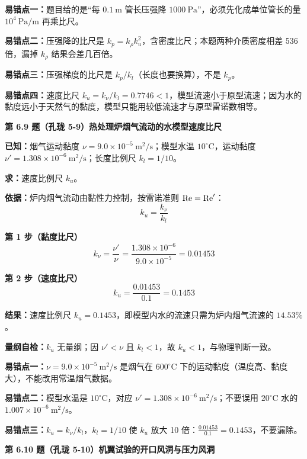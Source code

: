 \begin{yicuo}
\textbf{易错点一：}题目给的是“每 $0.1\ \mathrm{m}$ 管长压强降 $1000\ \mathrm{Pa}$”，必须先化成单位管长的量 $10^{4}\ \mathrm{Pa/m}$ 再乘比尺。

\textbf{易错点二：}压强降的比尺是 $k_p=k_\rho k_u^{2}$，含密度比尺；本题两种介质密度相差 536 倍，漏掉 $k_\rho$ 结果会差几百倍。

\textbf{易错点三：}压强梯度的比尺是 $k_p/k_l$（长度也要换算），不是 $k_p$。

\textbf{易错点四：}速度比尺 $k_u=k_\nu/k_l=0.7746<1$，模型流速小于原型流速；因为水的黏度远小于天然气的黏度，模型只能用较低流速才与原型雷诺数相等。
\end{yicuo}

\noindent\textbf{第 6.9 题（孔珑 5-9）\quad 热处理炉烟气流动的水模型速度比尺}

\begin{jie}
\textbf{已知：}烟气运动黏度 $\nu=9.0\times10^{-5}\ \mathrm{m^2/s}$；模型水温 $10^{\circ}\mathrm{C}$，运动黏度 $\nu'=1.308\times10^{-6}\ \mathrm{m^2/s}$；长度比例尺 $k_l=1/10$。

\textbf{求：}速度比例尺 $k_u$。

\textbf{依据：}炉内烟气流动由黏性力控制，按雷诺准则 $\mathrm{Re}=\mathrm{Re}'$：
\[k_u=\frac{k_\nu}{k_l}\]

\textbf{第 1 步（黏度比尺）}\quad
\[k_\nu=\frac{\nu'}{\nu}=\frac{1.308\times10^{-6}}{9.0\times10^{-5}}=0.01453\]

\textbf{第 2 步（速度比尺）}\quad
\[k_u=\frac{0.01453}{0.1}=0.1453\]

\textbf{结果：}速度比例尺 $k_u=0.1453$，即模型内水的流速只需为炉内烟气流速的 $14.53\%$。

\textbf{量纲自检：}$k_u$ 无量纲；因 $\nu'<\nu$ 且 $k_l<1$，故 $k_u<1$，与物理判断一致。
\end{jie}

\begin{yicuo}
\textbf{易错点一：}$\nu=9.0\times10^{-5}\ \mathrm{m^2/s}$ 是烟气在 $600^{\circ}\mathrm{C}$ 下的运动黏度（温度高、黏度大），不能改用常温烟气数据。

\textbf{易错点二：}模型水温是 $10^{\circ}\mathrm{C}$，对应 $\nu'=1.308\times10^{-6}\ \mathrm{m^2/s}$；不要误用 $20^{\circ}\mathrm{C}$ 水的 $1.007\times10^{-6}\ \mathrm{m^2/s}$。

\textbf{易错点三：}$k_u=k_\nu/k_l$，$k_l=1/10$ 使 $k_u$ 放大 10 倍：$\frac{0.01453}{0.1}=0.1453$，不要漏除。
\end{yicuo}

\noindent\textbf{第 6.10 题（孔珑 5-10）\quad 机翼试验的开口风洞与压力风洞}

